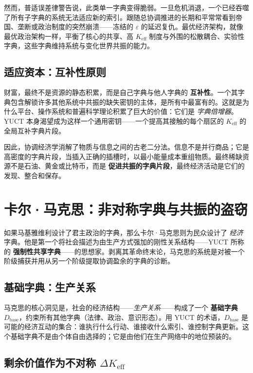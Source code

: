 \documentclass[12pt,a4paper]{article}
\newcommand{\Keff}{K_{\mathrm{eff}}}
\begin{document}
	然而，普适误差律警告说，此类单一字典变得脆弱。一旦危机消退，一个已经吞噬了所有子字典的系统无法适应新的索引。跟随总协调推进的长期和平常常看到帝国、垄断或政治制度的突然崩溃——冻结的 $\varepsilon$ 的延迟复仇。最优经济架构，就像最优政治架构一样，平衡了核心的共享、高 $\Keff$ 制度与外围的松散耦合、实验性字典，这些字典维持系统与变化世界共振的能力。
	
	\subsection{适应资本：互补性原则}
	
	财富，最终不是资源的静态积累，而是自己字典与他人字典的 \textbf{互补性}。一个其字典包含解锁许多其他系统中共振的缺失密钥的主体，是所有中最富有的。这就是为什么平台、操作系统和普遍科学理论积累了巨大的价值：它们是 \emph{字典倍增器}。YUCT 本身渴望成为这样一个通用密钥——一个提高其接触的每个扇区的 $\Keff$ 的全局互补字典片段。
	
	因此，协调经济学消解了物质与信息之间的古老二分法。信息不是并行商品；它是高密度的字典片段，当插入正确的插槽时，以最小能量成本重组物质。最终稀缺资源不是石油、黄金或比特币，而是 \textbf{促进共振的字典片段}，最终经济活动是它们的发现、整合和保存。
	
	\section{卡尔·马克思：非对称字典与共振的盗窃}
	\label{sec:marx}
	
	如果马基雅维利设计了君主政治的字典，那么卡尔·马克思则为民众设计了 \emph{经济} 字典。他是第一个将社会描述为由生产方式强加的刚性关系结构——YUCT 所称的 \textbf{强制性共享字典}——的思想家。剥离其革命终末论，马克思的系统是对被一个阶级捕获并用从另一个阶级提取协调盈余的字典的诊断。
	
	\subsection{基础字典：生产关系}
	
	马克思的核心洞见是，社会的经济结构——\emph{生产关系}——构成了一个 \textbf{基础字典} \(D_{\text{base}}\)，约束所有其他字典（法律、政治、意识形态）。用 YUCT 的术语，\(D_{\text{base}}\) 是可能的经济互动的集合：谁执行什么行动、谁接收什么索引、谁控制字典更新。这个基础字典不是由个体自由选择的；它是由他们在生产网络中的地位预装的。
	
	\subsection{剩余价值作为不对称 \(\Delta\Keff\)}
	
\end{document}
